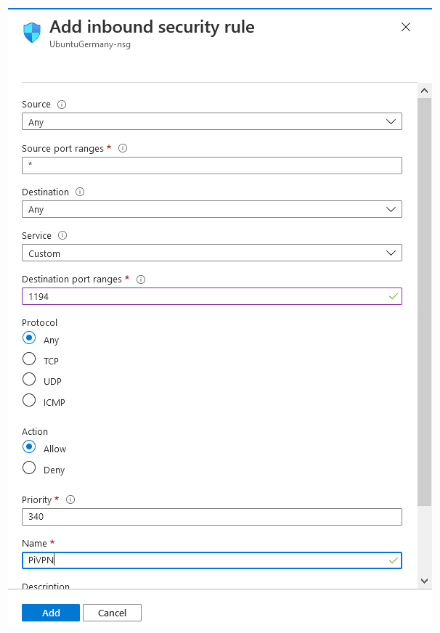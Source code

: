 \documentclass[a4paper,12pt]{article}
\begin{document}
	\begin{figure}[H]
		\includegraphics{images/PiVPNInboundRule.png}
	\end{figure}
\end{document}
